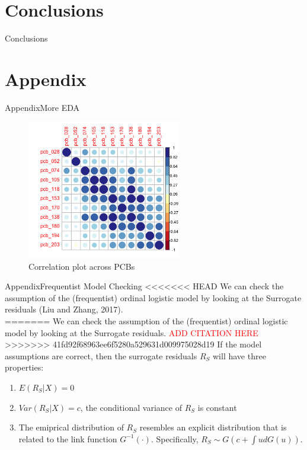 \documentclass{beamer}\usepackage[]{graphicx}\usepackage[]{color}
\begin{document}

\section{Conclusions}
\begin{frame}{Conclusions}
\end{frame}

\appendix
\section{Appendix}
\begin{frame}{Appendix}{More EDA}
\begin{figure}
  \centering
  \includegraphics[width=0.6\textwidth]{corrplot_PCB.png}
\caption{Correlation plot across PCBs}
\label{fig:corrPCB}
\end{figure}
\end{frame}
\begin{frame}{Appendix}{Frequentist Model Checking}
<<<<<<< HEAD
We can check the assumption of the (frequentist) ordinal logistic model by looking at the Surrogate residuals (Liu and Zhang, 2017).\\
=======
We can check the assumption of the (frequentist) ordinal logistic model by looking at the Surrogate residuals. \textcolor{red}{ADD CITATION HERE}\\
>>>>>>> 41fd92f68963ee6f5280a529631d009975028d19
\medskip
If the model assumptions are correct, then the surrogate residuals $R_S$ will have three properties:
\begin{enumerate}
 \item $E(R_S|X)=0$
 \item $Var(R_S|X)=c$, the conditional variance of $R_S$ is constant
 \item The emiprical distribution of $R_S$ resembles an explicit distribution that is related to the link function $G^{-1}(\cdot)$. Specifically, $R_S\sim G(c+\int ud G(u))$.
\end{enumerate}
\end{frame}
\end{document}
